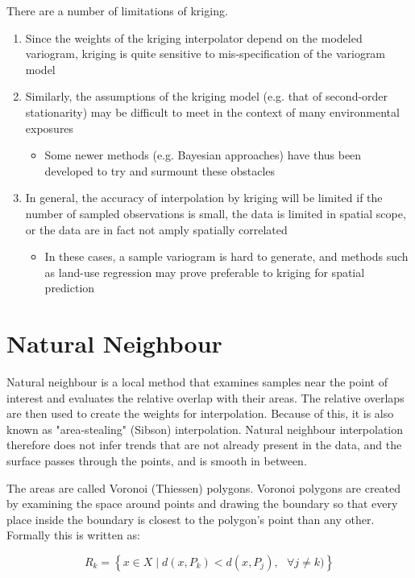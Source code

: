 \documentclass{article}
\begin{document}
There are a number of limitations of kriging.

\begin{enumerate}
    \item Since the weights of the kriging interpolator depend on the modeled variogram, kriging is quite sensitive to mis-specification of the variogram model
    \item Similarly, the assumptions of the kriging model (e.g. that of second-order stationarity) may be difficult to meet in the context of many environmental exposures
    \begin{itemize}
        \item Some newer methods (e.g. Bayesian approaches) have thus been developed to try and surmount these obstacles
    \end{itemize}
    \item In general, the accuracy of interpolation by kriging will be limited if the number of sampled observations is small, the data is limited in spatial scope, or the data are in fact not amply spatially correlated
    \begin{itemize}
        \item In these cases, a sample variogram is hard to generate, and methods such as land-use regression may prove preferable to kriging for spatial prediction
    \end{itemize}
\end{enumerate}



\section{Natural Neighbour}

Natural neighbour is a local method that examines samples near the point of interest and evaluates the relative overlap with their areas.
The relative overlaps are then used to create the weights for interpolation.
Because of this, it is also known as "area-stealing" (Sibson) interpolation.
Natural neighbour interpolation therefore does not infer trends that are not already present in the data, and the surface passes through the points, and is smooth in between.

The areas are called Voronoi (Thiessen) polygons.
Voronoi polygons are created by examining the space around points and drawing the boundary so that every place inside the boundary is closest to the polygon's point than any other.
Formally this is written as:

\[R_{k} = \left\{x \in X \mid d(x, P_{k}) < d(x, P_{j}),  \text{ } \forall j \neq k)\right\}\]
\end{document}
